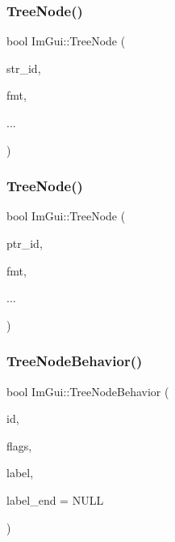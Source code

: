 \subsubsection{\texorpdfstring{Tree\+Node()}{TreeNode()}\hspace{0.1cm}{\footnotesize\ttfamily [2/3]}}
{\footnotesize\ttfamily bool Im\+Gui\+::\+Tree\+Node (\begin{DoxyParamCaption}\item[{const char $\ast$}]{str\+\_\+id,  }\item[{const char $\ast$}]{fmt,  }\item[{}]{... }\end{DoxyParamCaption})}

\hypertarget{namespace_im_gui_a47f1421323f90fdd0a9cbfea2338b10f}{}\label{namespace_im_gui_a47f1421323f90fdd0a9cbfea2338b10f} 
\subsubsection{\texorpdfstring{Tree\+Node()}{TreeNode()}\hspace{0.1cm}{\footnotesize\ttfamily [3/3]}}
{\footnotesize\ttfamily bool Im\+Gui\+::\+Tree\+Node (\begin{DoxyParamCaption}\item[{const void $\ast$}]{ptr\+\_\+id,  }\item[{const char $\ast$}]{fmt,  }\item[{}]{... }\end{DoxyParamCaption})}

\hypertarget{namespace_im_gui_a918eabf70d288e93b2519ee1eac2c0b4}{}\label{namespace_im_gui_a918eabf70d288e93b2519ee1eac2c0b4} 
\subsubsection{\texorpdfstring{Tree\+Node\+Behavior()}{TreeNodeBehavior()}}
{\footnotesize\ttfamily bool Im\+Gui\+::\+Tree\+Node\+Behavior (\begin{DoxyParamCaption}\item[{Im\+Gui\+ID}]{id,  }\item[{Im\+Gui\+Tree\+Node\+Flags}]{flags,  }\item[{const char $\ast$}]{label,  }\item[{const char $\ast$}]{label\+\_\+end = {\ttfamily NULL} }\end{DoxyParamCaption})}

